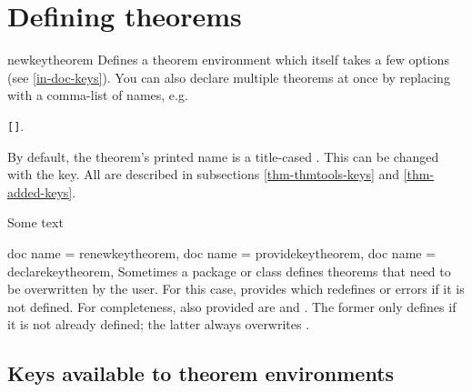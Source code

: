 \documentclass{ltxdoc}
\newcommand{\bracks}[1]{\texttt{[#1]}}
\newcommand{\ttbraces}[1]{\braces{\texttt{#1}}}
\begin{document}
\section{Defining theorems}

\begin{docCommand}{newkeytheorem}
  {}
Defines a theorem environment  which itself takes a few options (see \autoref{in-doc-keys}).
You can also declare multiple theorems at once by replacing  with a comma-list of names, e.g.
\begin{center}
\ttbraces{theorem,lemma,proposition}\bracks{}.
\end{center}

By default, the theorem's printed name is a title-cased .
This can be changed with the  key.
All  are described in subsections \ref{thm-thmtools-keys} and \ref{thm-added-keys}.

\begin{tcbwritetemp}
\end{tcbwritetemp}

\begin{keythmscode}[withpreamble]
\begin{theorem}
Some text
\end{theorem}
\end{keythmscode}

\end{docCommand}

\begin{docCommands}[
  doc parameter=\marg{env name}\oarg{options}
  ]
  {
    {doc name = renewkeytheorem},
    {doc name = providekeytheorem},
    {doc name = declarekeytheorem},
  }
Sometimes a package or class defines theorems that need to be overwritten by the user. For this case,  provides  which redefines  or errors if it is not defined. For completeness, also provided are  and . The former only defines  if it is not already defined; the latter always overwrites .
\end{docCommands}

\subsection{Keys available to theorem environments} \label{in-doc-keys}
\end{document}
